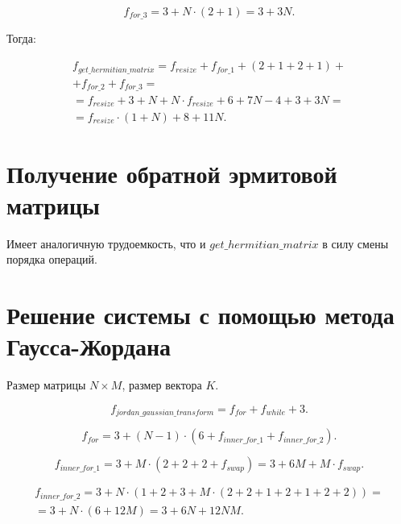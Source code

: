 \begin{equation}
	f_{for\_3} = 3 + N \cdot (2 + 1) = 3 + 3N.
\end{equation}

Тогда:

\begin{equation}
	\begin{gathered}
		f_{get\_hermitian\_matrix} = f_{resize} + f_{for\_1} + (2 + 1 + 2 + 1) +\\+ f_{for\_2} + f_{for\_3} =\\=f_{resize} + 3 + N + N \cdot f_{resize} + 6 + 7N - 4 + 3 + 3N =\\=
		f_{resize} \cdot (1 + N) + 8 + 11N.
	\end{gathered}
\end{equation}

\section{Получение обратной эрмитовой матрицы}

Имеет аналогичную трудоемкость, что и $get\_hermitian\_matrix$ в силу смены порядка операций.

\section{Решение системы с помощью метода Гаусса-Жордана}

Размер матрицы $N \times M$, размер вектора $K$.

\begin{equation}
	f_{jordan\_gaussian\_transform} = f_{for} + f_{while} + 3.
\end{equation}

\begin{equation}
	f_{for} = 3 + (N - 1) \cdot (6 + f_{inner\_for\_1} + f_{inner\_for\_2}).
\end{equation}

\begin{equation}
	f_{inner\_for\_1} = 3 + M \cdot (2 + 2 + 2 + f_{swap}) = 3 + 6M + M \cdot f_{swap}.
\end{equation}

\begin{equation}
	\begin{gathered}
		f_{inner\_for\_2} = 3 + N \cdot (1 + 2 + 3 + M \cdot (2 + 2 + 1 + 2 + 1 + 2 + 2)) =\\=
		3 + N \cdot (6 + 12M) = 3 + 6N + 12NM.
	\end{gathered}
\end{equation}

